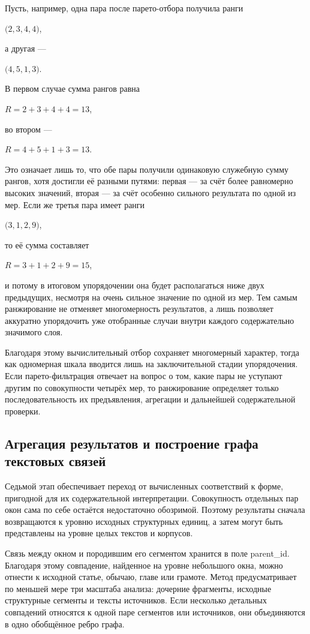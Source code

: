 Пусть, например, одна пара после парето-отбора получила ранги

$\bigl(2,3,4,4\bigr)$,

а другая ---

$\bigl(4,5,1,3\bigr)$.

В первом случае сумма рангов равна

$R=2+3+4+4=13$,

во втором ---

$R=4+5+1+3=13$.

Это означает лишь то, что обе пары получили одинаковую служебную сумму рангов, хотя достигли её разными путями: первая --- за счёт более равномерно высоких значений, вторая --- за счёт особенно сильного результата по одной из мер. Если же третья пара имеет ранги

$\bigl(3,1,2,9\bigr)$,

то её сумма составляет

$R=3+1+2+9=15$,

и потому в итоговом упорядочении она будет располагаться ниже двух предыдущих, несмотря на очень сильное значение по одной из мер. Тем самым ранжирование не отменяет многомерность результатов, а лишь позволяет аккуратно упорядочить уже отобранные случаи внутри каждого содержательно значимого слоя.

Благодаря этому вычислительный отбор сохраняет многомерный характер, тогда как одномерная шкала вводится лишь на заключительной стадии упорядочения. Если парето-фильтрация отвечает на вопрос о том, какие пары не уступают другим по совокупности четырёх мер, то ранжирование определяет только последовательность их предъявления, агрегации и дальнейшей содержательной проверки.

\subsection{Агрегация результатов и построение графа текстовых связей}

Седьмой этап обеспечивает переход от вычисленных соответствий к форме, пригодной для их содержательной интерпретации. Совокупность отдельных пар окон сама по себе остаётся недостаточно обозримой. Поэтому результаты сначала возвращаются к уровню исходных структурных единиц, а затем могут быть представлены на уровне целых текстов и корпусов.

Связь между окном и породившим его сегментом хранится в поле parent\_id. Благодаря этому совпадение, найденное на уровне небольшого окна, можно отнести к исходной статье, обычаю, главе или грамоте. Метод предусматривает по меньшей мере три масштаба анализа: дочерние фрагменты, исходные структурные сегменты и тексты источников. Если несколько детальных совпадений относятся к одной паре сегментов или источников, они объединяются в одно обобщённое ребро графа.

